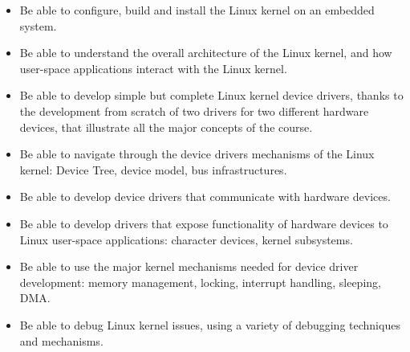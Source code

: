 {{\begin{itemize}
    \item Be able to configure, build and install the Linux kernel on an
      embedded system.
    \item Be able to understand the overall architecture of the Linux
      kernel, and how user-space applications interact with the Linux
      kernel.
    \item Be able to develop simple but complete Linux kernel device
      drivers, thanks to the development from scratch of two drivers for
      two different hardware devices, that illustrate all the major
      concepts of the course.
    \item Be able to navigate through the device drivers mechanisms of
      the Linux kernel: Device Tree, device model, bus infrastructures.
    \item Be able to develop device drivers that communicate with
      hardware devices.
    \item Be able to develop drivers that expose functionality of
      hardware devices to Linux user-space applications: character
      devices, kernel subsystems.
    \item Be able to use the major kernel mechanisms needed for device
      driver development: memory management, locking, interrupt
      handling, sleeping, DMA.
    \item Be able to debug Linux kernel issues, using a variety of
      debugging techniques and mechanisms.
    \end{itemize}
  }
}

\def \trainingprerequisites{
  \begin{itemize}
    \prerequisiteclanguage
    \prerequisitecommandline
    \prerequisiteembeddedlinux
    \prerequisiteenglish
  \end{itemize}
}


\def \onsitelecturetimeratio{50}
\def \onsitelabtimeratio{50}


